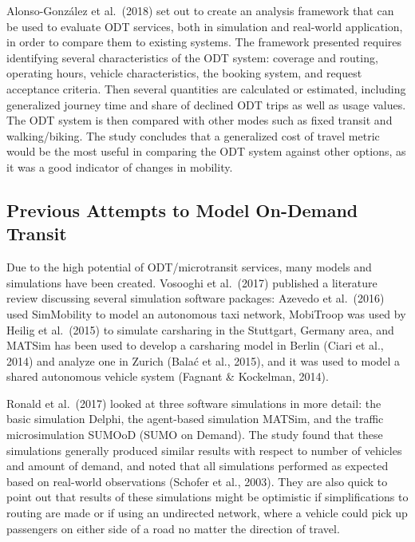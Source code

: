 \documentclass[
]{article}
\begin{document}
Alonso-González et al.~(2018) set out to create an analysis framework that can be used to evaluate ODT services, both in simulation and real-world application, in order to compare them to existing systems. The framework presented requires identifying several characteristics of the ODT system: coverage and routing, operating hours, vehicle characteristics, the booking system, and request acceptance criteria. Then several quantities are calculated or estimated, including generalized journey time and share of declined ODT trips as well as usage values. The ODT system is then compared with other modes such as fixed transit and walking/biking. The study concludes that a generalized cost of travel metric would be the most useful in comparing the ODT system against other options, as it was a good indicator of changes in mobility.

\hypertarget{previous-attempts-to-model-on-demand-transit}{%
\subsection{Previous Attempts to Model On-Demand Transit}\label{previous-attempts-to-model-on-demand-transit}}

Due to the high potential of ODT/microtransit services, many models and simulations have been created. Vosooghi et al.~(2017) published a literature review discussing several simulation software packages: Azevedo et al.~(2016) used SimMobility to model an autonomous taxi network, MobiTroop was used by Heilig et al.~(2015) to simulate carsharing in the Stuttgart, Germany area, and MATSim has been used to develop a carsharing model in Berlin (Ciari et al., 2014) and analyze one in Zurich (Balać et al., 2015), and it was used to model a shared autonomous vehicle system (Fagnant \& Kockelman, 2014).

Ronald et al.~(2017) looked at three software simulations in more detail: the basic simulation Delphi, the agent-based simulation MATSim, and the traffic microsimulation SUMOoD (SUMO on Demand). The study found that these simulations generally produced similar results with respect to number of vehicles and amount of demand, and noted that all simulations performed as expected based on real-world observations (Schofer et al., 2003). They are also quick to point out that results of these simulations might be optimistic if simplifications to routing are made or if using an undirected network, where a vehicle could pick up passengers on either side of a road no matter the direction of travel.
\end{document}
